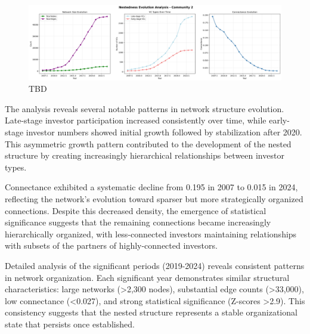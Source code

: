 \begin{figure}[htbp]
\hspace*{-1cm}\centering
\includegraphics[width=1.2\textwidth]{../figures/us/nestedness_evolution_community_2_pt3.png}
\caption{TBD}
\label{fig:connectance_evolution}
\end{figure}

The analysis reveals several notable patterns in network structure evolution. Late-stage investor participation increased consistently over time, while early-stage investor numbers showed initial growth followed by stabilization after 2020. This asymmetric growth pattern contributed to the development of the nested structure by creating increasingly hierarchical relationships between investor types.

Connectance exhibited a systematic decline from 0.195 in 2007 to 0.015 in 2024, reflecting the network's evolution toward sparser but more strategically organized connections. Despite this decreased density, the emergence of statistical significance suggests that the remaining connections became increasingly hierarchically organized, with less-connected investors maintaining relationships with subsets of the partners of highly-connected investors.

Detailed analysis of the significant periods (2019-2024) reveals consistent patterns in network organization. Each significant year demonstrates similar structural characteristics: large networks (>2,300 nodes), substantial edge counts (>33,000), low connectance (<0.027), and strong statistical significance (Z-scores >2.9). This consistency suggests that the nested structure represents a stable organizational state that persists once established.

